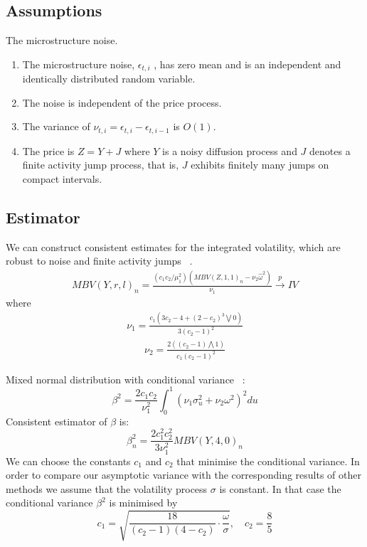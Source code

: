 \documentclass[letterpaper]{report}
\begin{document}
\subsection{Assumptions}
The microstructure noise.
\begin{enumerate}
\item The microstructure noise, $\epsilon_{t,i}$ , has zero mean and is an
independent and identically distributed random variable.
\item The noise is independent of the price process.
\item The variance of $\nu_{t,i} = \epsilon_{t,i} - \epsilon_{t,i-1}$ is
$O(1)$.
\item The price is $Z = Y + J$ where $Y$ is a noisy diffusion process and $J$ denotes a finite activity jump
process, that is, $J$ exhibits finitely many jumps on compact intervals.
\end{enumerate}
\subsection{Estimator}
We can construct consistent estimates for the integrated volatility, which are robust to noise and finite activity jumps
~\cite[Podolskij and Vetter, 2009]{Podolskij_Vetter}.
\begin{gather}
MBV(Y,r,l)_n =\frac{(c_1 c_2/\mu_1^2)(MBV(Z,1,1)_n-\nu_2\hat{\omega}^2)}{\nu_1} \stackrel{p}{\to} IV
\end{gather}
where
\begin{gather}
\nu_1 = \frac{c_1(3c_2-4+(2-c_2)^3\bigvee 0)}{3(c_2-1)^2}
\end{gather}
\begin{gather}
\nu_2 = \frac{2((c_2-1)\bigwedge 1)}{c_1(c_2-1)^2}
\end{gather}

Mixed normal distribution with conditional variance ~\cite[Podolskij and Vetter, 2009]{Podolskij_Vetter}:
\begin{equation}
\beta^2 = \frac{2c_1 c_2}{\nu^2_1}\int_0^1(\nu_1\sigma_u^2+\nu_2\omega^2)^2du
\end{equation}
Consistent estimator of $\beta$ is:
\begin{equation}
\beta^2_n = \frac{2c_1^2 c_2^2}{3\nu^2_1}MBV(Y,4,0)_n
\end{equation}
We can choose the constants $c_1$ and
$c_2$ that minimise the conditional variance. In order to compare our asymptotic variance
with the corresponding results of other methods we assume that the volatility process $\sigma$
is constant. In that case the conditional variance $\beta^2$ is minimised by
\begin{equation}
c_1 = \sqrt{\frac{18}{(c_2-1)(4-c_2)}\cdot\frac{\omega}{\sigma}}, \quad
c_2 = \frac{8}{5}
\end{equation}
\end{document}
